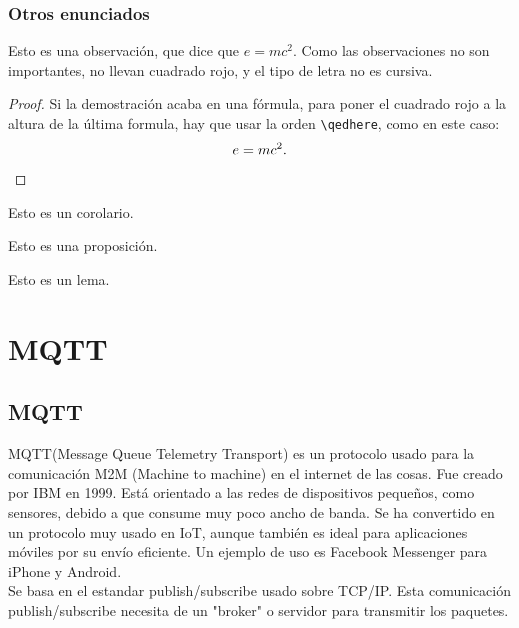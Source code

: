 \documentclass[12pt, twoside]{book}
\begin{document}
\subsection{Otros enunciados}


\begin{remark}
    Esto es una observación, que dice que $e=mc^{2}$. Como las observaciones no son importantes, no llevan cuadrado rojo, y el tipo de letra no es cursiva.
\end{remark}


\begin{proof}
    Si la demostración acaba en una fórmula, para poner el cuadrado rojo a la altura de la última formula, hay que usar la orden \verb|\qedhere|, como en este caso:
    \[
        e=mc^{2}.\qedhere
    \]

\end{proof}


\begin{corollary}\label{cor:1}
    Esto es un corolario.
\end{corollary}

\begin{proposition}\label{pro:1}
    Esto es una proposición.
\end{proposition}

\begin{lemma}[Gauss]\label{lem:1}
    Esto es un lema.
\end{lemma}


\backmatter




\chapter{MQTT}

\section{MQTT}
MQTT(Message Queue Telemetry Transport) es un protocolo usado para la comunicación M2M (Machine to machine) en el internet de las cosas. Fue creado por IBM en 1999. Está orientado a las redes de dispositivos pequeños, como sensores, debido a que consume muy poco ancho de banda. Se ha convertido en un protocolo muy usado en IoT, aunque también es ideal para aplicaciones móviles por su envío eficiente. Un ejemplo de uso es Facebook Messenger para iPhone y Android.\\
Se basa en el estandar publish/subscribe usado sobre TCP/IP. Esta comunicación publish/subscribe necesita de un "broker" o servidor para transmitir los paquetes.
\end{document}
